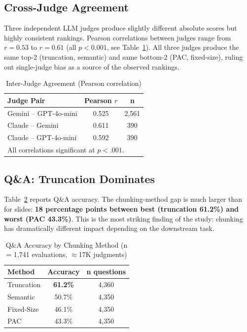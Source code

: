 \documentclass[journal]{IEEEtran}
\begin{document}
\subsection{Cross-Judge Agreement}

Three independent LLM judges produce slightly different absolute scores but highly consistent rankings. Pearson correlations between judges range from $r = 0.53$ to $r = 0.61$ (all $p < 0.001$, see Table~\ref{tab:agreement}). All three judges produce the same top-2 (truncation, semantic) and same bottom-2 (PAC, fixed-size), ruling out single-judge bias as a source of the observed rankings.

\begin{table}[h]
\centering
\caption{Inter-Judge Agreement (Pearson correlation)}
\label{tab:agreement}
\footnotesize
\begin{tabular}{lcc}
\toprule
\textbf{Judge Pair} & \textbf{Pearson $r$} & \textbf{n} \\
\midrule
Gemini -- GPT-4o-mini & 0.525 & 2{,}561 \\
Claude -- Gemini & 0.611 & 390 \\
Claude -- GPT-4o-mini & 0.592 & 390 \\
\bottomrule
\multicolumn{3}{l}{\scriptsize All correlations significant at $p < .001$.}
\end{tabular}
\end{table}

\subsection{Q\&A: Truncation Dominates}
\label{sec:qa-results}

Table~\ref{tab:qa} reports Q\&A accuracy. The chunking-method gap is much larger than for slides: \textbf{18 percentage points between best (truncation 61.2\%) and worst (PAC 43.3\%)}. This is the most striking finding of the study: chunking has dramatically different impact depending on the downstream task.

\begin{table}[h]
\centering
\caption{Q\&A Accuracy by Chunking Method (n = 1{,}741 evaluations, $\approx$17K judgments)}
\label{tab:qa}
\begin{tabular}{lcc}
\toprule
\textbf{Method} & \textbf{Accuracy} & \textbf{n questions} \\
\midrule
Truncation & \textbf{61.2\%} & 4{,}360 \\
Semantic & 50.7\% & 4{,}350 \\
Fixed-Size & 46.1\% & 4{,}350 \\
PAC & 43.3\% & 4{,}350 \\
\bottomrule
\end{tabular}
\end{table}
\end{document}
